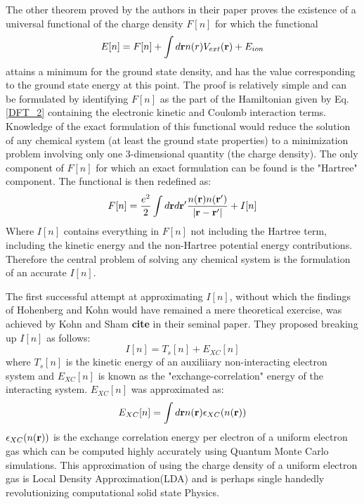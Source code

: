 \documentclass[10pt]{ruthesis}
\begin{document}
The other theorem proved by the authors in their paper proves the existence of   a universal functional of the charge density $F[n]$ for which the functional
\begin{equation}
E[n]=F[n] +\int d \mathbf{r} n(r) V_{ext}(\mathbf{r}) + E_{ion} 
\end{equation}
attains a minimum for the ground state density, and has the value corresponding to the ground state energy at this point. The proof is relatively simple and can be formulated by identifying $F[n]$ as the part of the Hamiltonian given by Eq. \ref{DFT_2} containing the electronic kinetic and Coulomb interaction terms. Knowledge of the exact formulation of this functional would reduce the solution of any chemical system (at least the ground state properties) to a minimization problem involving only one 3-dimensional quantity (the charge density). The only component of $F[n]$ for which an exact formulation can be found is the "Hartree" component. The functional is then redefined as:
\begin{equation}
 F[n]= \dfrac{e^2}{2}\int d\mathbf{r} d\mathbf{r}' \dfrac{n(\mathbf{r}) n(\mathbf{r}')}{|\mathbf{r}-\mathbf{r}'|} + I[n]
 \end{equation} 
Where $I[n]$ contains everything in $F[n]$ not including the Hartree term, including the kinetic energy and the non-Hartree potential energy contributions. Therefore the central problem of solving any chemical system is the formulation of an accurate $I[n]$.

The first successful attempt at approximating $I[n]$, without which the findings of Hohenberg and Kohn would have remained a mere theoretical exercise, was achieved by Kohn and Sham \textbf{cite} in their seminal paper. They proposed breaking up $I[n]$ as follows:
\begin{equation}
 I[n]=T_s[n]+E_{XC}[n]
 \end{equation} 
where $T_s[n]$ is the kinetic energy of an auxiliiary non-interacting electron system and $E_{XC}[n]$ is known as the "exchange-correlation" energy of the interacting system. $E_{XC}[n]$ was approximated as:
\begin{equation}
E_{XC}[n]=\int d\mathbf{r} n(\mathbf{r}) \epsilon_{XC}(n(\mathbf{r}))
\end{equation}
$\epsilon_{XC}(n(\mathbf{r}))$ is the exchange correlation energy per electron of a uniform electron gas which can be computed highly accurately using Quantum Monte Carlo simulations. This approximation of using the charge density of a uniform electron gas is Local Density Approximation(LDA) and is perhaps single handedly revolutionizing computational solid state Physics. 
\end{document}
